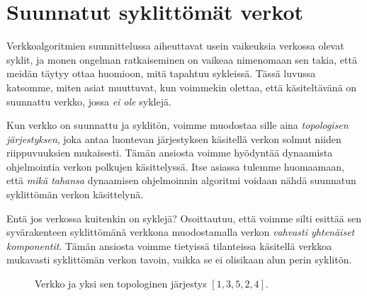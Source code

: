 \chapter{Suunnatut syklittömät verkot}


Verkkoalgoritmien suunnittelussa aiheuttavat
usein vaikeuksia verkossa olevat syklit,
ja monen ongelman ratkaiseminen on vaikeaa nimenomaan
sen takia, että meidän täytyy ottaa huomioon,
mitä tapahtuu sykleissä.
Tässä luvussa katsomme, miten asiat muuttuvat,
kun voimmekin olettaa, että käsitel\-tävänä on suunnattu verkko,
jossa \emph{ei ole} syklejä.

Kun verkko on suunnattu ja syklitön,
voimme muodostaa sille aina \emph{topologisen järjestyksen},
joka antaa luontevan järjestyksen käsitellä
verkon solmut niiden riippuvuuksien mukaisesti.
Tämän ansiosta voimme hyödyntää dynaamista ohjelmointia
verkon polkujen käsittelyssä.
Itse asiassa tulemme huomaamaan, että \emph{mikä tahansa}
dynaamisen ohjelmoinnin algoritmi voidaan nähdä
suunnatun syklittömän verkon käsittelynä.

Entä jos verkossa kuitenkin on syklejä?
Osoittautuu, että voimme silti esittää sen syvärakenteen
syklittömänä verkkona muodostamalla verkon
\emph{vahvasti yhtenäiset komponentit}.
Tämän ansiosta voimme tietyissä tilanteissa käsitellä
verkkoa mukavasti syklittömän verkon tavoin,
vaikka se ei olisikaan alun perin syklitön.

\begin{figure}[ht]
\center
\begin{center}
\end{center}
\caption{Verkko ja yksi sen topologinen järjestys $[1,3,5,2,4]$.}
\label{fig:topjar}
\end{figure}


